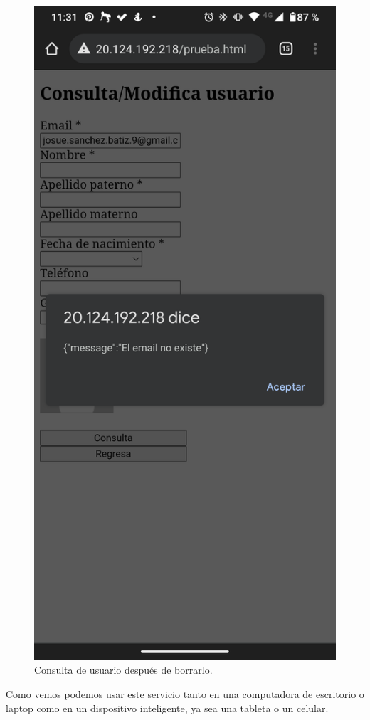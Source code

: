 \documentclass[11pt]{article}
\begin{document}
		\begin{figure}[H]
			\centering
			\includegraphics[scale=0.18]{resources/Screenshot_20211219-233150.png}
			\caption{Consulta de usuario después de borrarlo.}\label{fig:picture}
		\end{figure}
		Como vemos podemos usar este servicio tanto en una computadora de escritorio o laptop como en un dispositivo inteligente, ya sea una tableta o un celular.
\end{document}
